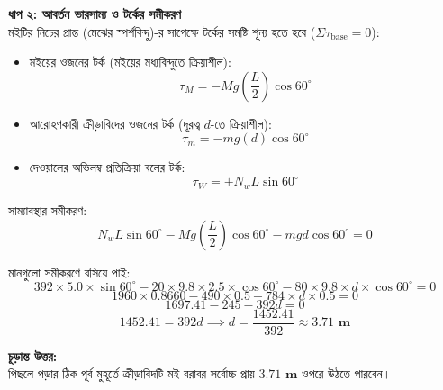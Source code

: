 \documentclass[12pt, a4paper]{article}
\begin{document}
\begin{tcolorbox}[solutionbox={সমাধান (Solution)}]
\begin{center}
\end{center}
\vspace{1em}

\vspace{0.5em}
\noindent
\textbf{ধাপ ২: আবর্তন ভারসাম্য ও টর্কের সমীকরণ} \\
মইটির নিচের প্রান্ত (মেঝের স্পর্শবিন্দু)-র সাপেক্ষে টর্কের সমষ্টি শূন্য হতে হবে ($\Sigma \tau_{\text{base}} = 0$):
\begin{itemize}[leftmargin=*, parsep=0.4ex]
    \item মইয়ের ওজনের টর্ক (মইয়ের মধ্যবিন্দুতে ক্রিয়াশীল): 
    $$\tau_M = - M g \left(\frac{L}{2}\right) \cos 60^\circ$$
    \item আরোহণকারী ক্রীড়াবিদের ওজনের টর্ক (দূরত্ব $d$-তে ক্রিয়াশীল): 
    $$\tau_m = - m g (d) \cos 60^\circ$$
    \item দেওয়ালের অভিলম্ব প্রতিক্রিয়া বলের টর্ক: 
    $$\tau_W = + N_w L \sin 60^\circ$$
\end{itemize}

সাম্যাবস্থার সমীকরণ:
$$N_w L \sin 60^\circ - M g \left(\frac{L}{2}\right) \cos 60^\circ - m g d \cos 60^\circ = 0$$

মানগুলো সমীকরণে বসিয়ে পাই:
$$392 \times 5.0 \times \sin 60^\circ - 20 \times 9.8 \times 2.5 \times \cos 60^\circ - 80 \times 9.8 \times d \times \cos 60^\circ = 0$$ 
$$1960 \times 0.8660 - 490 \times 0.5 - 784 \times d \times 0.5 = 0$$ 
$$1697.41 - 245 - 392 d = 0$$ 
$$1452.41 = 392 d \implies d = \frac{1452.41}{392} \approx \mathbf{3.71\text{ m}}$$

\vspace{1em}
\begin{tcolorbox}[answerbox]
\textbf{চূড়ান্ত উত্তর:} \\
পিছলে পড়ার ঠিক পূর্ব মুহূর্তে ক্রীড়াবিদটি মই বরাবর সর্বোচ্চ প্রায় $\mathbf{3.71\text{ m}}$ ওপরে উঠতে পারবেন।
\end{tcolorbox}
\end{tcolorbox}
\end{document}

